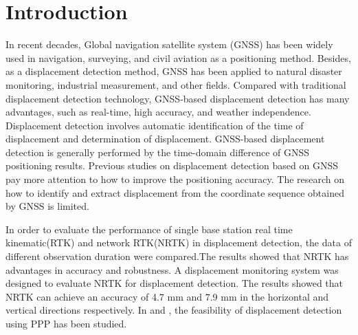\documentclass{svjour3}                     %
\begin{document}
\section{Introduction}
\label{intro}
In recent decades, Global navigation satellite system (GNSS) has been widely used in navigation, surveying, and civil aviation as a positioning method\citep{teunissen2017springer}. 
Besides, as a displacement detection method, GNSS has been applied to natural disaster monitoring\citep{awange2012environmental}, industrial measurement\citep{pavasovic2011application}, and other fields. 
Compared with traditional displacement detection technology, GNSS-based displacement detection has many advantages, such as real-time, high accuracy, and weather independence\citep{shen2019a}. 
Displacement detection involves automatic identification of the time of displacement and determination of displacement. 
GNSS-based displacement detection is generally performed by the time-domain difference of GNSS positioning results. 
Previous studies on displacement detection based on GNSS pay more attention to how to improve the positioning accuracy. The research on how to identify and extract displacement from the coordinate sequence obtained by GNSS is limited.

In order to evaluate the performance of single base station real time kinematic(RTK) and network RTK(NRTK) in displacement detection, the data of different observation duration were compared\citep{wang2011gps}.The results showed that NRTK has advantages in accuracy and robustness.
A displacement monitoring system was designed to evaluate NRTK for displacement detection\citep{GUMUS2019131}. The results showed that NRTK can achieve an accuracy of 4.7 mm and 7.9 mm in the horizontal and vertical directions respectively.
In \cite{csanliouglu2016landslide} and \cite{lytvyn2012real}, the feasibility of displacement detection using PPP has been studied.
\end{document}
